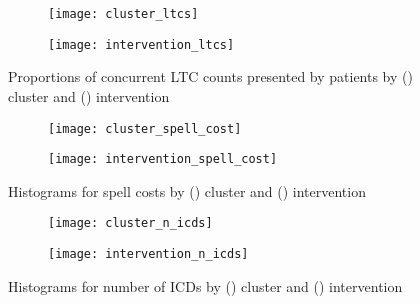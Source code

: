 \begin{figure}
    \centering
    \begin{subfigure}{\halfimgwidth}
        \texttt{[image: cluster\_ltcs]}
        \caption{}\label{fig:cluster_ltcs}
    \end{subfigure}\hfill%
    \begin{subfigure}{\halfimgwidth}
        \texttt{[image: intervention\_ltcs]}
        \caption{}\label{fig:intervention_ltcs}
    \end{subfigure}
    \caption{%
        Proportions of concurrent LTC counts presented by patients by
        () cluster and ()
        intervention
    }\label{fig:ltcs}
\end{figure}

\begin{figure}
    \centering
    \begin{subfigure}{\halfimgwidth}
        \texttt{[image: cluster\_spell\_cost]}
        \caption{}\label{fig:cluster_spell_cost}
    \end{subfigure}\hfill%
    \begin{subfigure}{\halfimgwidth}
        \texttt{[image: intervention\_spell\_cost]}
        \caption{}\label{fig:intervention_spell_cost}
    \end{subfigure}
    \caption{%
        Histograms for spell costs by () cluster
        and () intervention
    }\label{fig:wimd_hist}
\end{figure}

\begin{figure}
    \centering
    \begin{subfigure}{\halfimgwidth}
        \texttt{[image: cluster\_n\_icds]}
        \caption{}\label{fig:cluster_n_icds}
    \end{subfigure}\hfill%
    \begin{subfigure}{\halfimgwidth}
        \texttt{[image: intervention\_n\_icds]}
        \caption{}\label{fig:intervention_n_icds}
    \end{subfigure}
    \caption{%
        Histograms for number of ICDs by () cluster
        and () intervention
    }\label{fig:n_icds_hist}
\end{figure}

